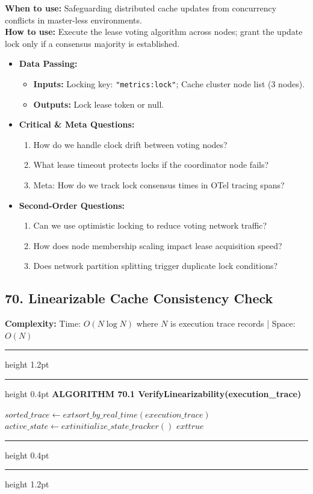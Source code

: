 \documentclass[11pt,a4paper]{article}
\newenvironment{textbookalgo}[2]{%
  \par\addvspace{1.2em}\noindent
  \hrule height 1.2pt
  \vspace{1.5pt}
  \hrule height 0.4pt
  \vspace{5pt}
  {\noindent\large\bfseries\sffamily ALGORITHM #1 \quad #2}
  \par\vspace{5pt}
  \RestyleAlgo{plain}
}{%
  \par\vspace{4pt}
  \hrule height 0.4pt
  \vspace{1.5pt}
  \hrule height 1.2pt
  \par\addvspace{1.2em}
}
\theoremstyle{definition}
\begin{document}
\noindent
\textbf{When to use:} Safeguarding distributed cache updates from concurrency conflicts in master-less environments.\\
\textbf{How to use:} Execute the lease voting algorithm across nodes; grant the update lock only if a consensus majority is established.
\begin{itemize}[leftmargin=*]
  \item[] \textbf{Data Passing:}
    \begin{itemize}
      \item \textbf{Inputs:} Locking key: \texttt{"metrics:lock"}; Cache cluster node list (3 nodes).
      \item \textbf{Outputs:} Lock lease token or null.
    \end{itemize}
  \item[] \textbf{Critical \& Meta Questions:}
  \begin{enumerate}
    \item How do we handle clock drift between voting nodes?
    \item What lease timeout protects locks if the coordinator node fails?
    \item Meta: How do we track lock consensus times in OTel tracing spans?
  \end{enumerate}
  \item[] \textbf{Second-Order Questions:}
  \begin{enumerate}
    \item Can we use optimistic locking to reduce voting network traffic?
    \item How does node membership scaling impact lease acquisition speed?
    \item Does network partition splitting trigger duplicate lock conditions?
  \end{enumerate}
\end{itemize}
\medskip

\clearpage
\subsection{70. Linearizable Cache Consistency Check}


\noindent
\textbf{Complexity:} Time: $O(N \log N)$ where $N$ is execution trace records | Space: $O(N)$
\smallskip

\begin{textbookalgo}{70.1}{VerifyLinearizability(execution\_trace)}
\begin{algorithm}[H]
$sorted\_trace \leftarrow 	ext{sort\_by\_real\_time}(execution\_trace)$\;
$active\_state \leftarrow 	ext{initialize\_state\_tracker}()$\;
\Return $	ext{true}$\;
\end{algorithm}
\end{textbookalgo}
\end{document}
